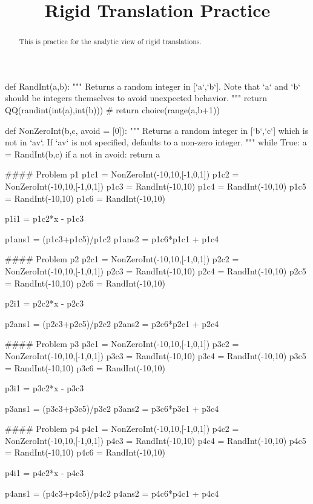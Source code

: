 \documentclass{ximeraXloud}
\title{Rigid Translation Practice}
\begin{document}
\begin{abstract}
    This is practice for the analytic view of rigid translations.
\end{abstract}
\maketitle

\begin{sagesilent}
def RandInt(a,b):
    """ Returns a random integer in [`a`,`b`]. Note that `a` and `b` should be integers themselves to avoid unexpected behavior.
    """
    return QQ(randint(int(a),int(b)))
    # return choice(range(a,b+1))

def NonZeroInt(b,c, avoid = [0]):
    """ Returns a random integer in [`b`,`c`] which is not in `av`. 
        If `av` is not specified, defaults to a non-zero integer.
    """
    while True:
        a = RandInt(b,c)
        if a not in avoid:
            return a


#### Problem p1
p1c1 = NonZeroInt(-10,10,[-1,0,1])
p1c2 = NonZeroInt(-10,10,[-1,0,1])
p1c3 = RandInt(-10,10)
p1c4 = RandInt(-10,10)
p1c5 = RandInt(-10,10)
p1c6 = RandInt(-10,10)

p1i1 = p1c2*x - p1c3

p1ans1 = (p1c3+p1c5)/p1c2
p1ans2 = p1c6*p1c1 + p1c4


#### Problem p2
p2c1 = NonZeroInt(-10,10,[-1,0,1])
p2c2 = NonZeroInt(-10,10,[-1,0,1])
p2c3 = RandInt(-10,10)
p2c4 = RandInt(-10,10)
p2c5 = RandInt(-10,10)
p2c6 = RandInt(-10,10)

p2i1 = p2c2*x - p2c3

p2ans1 = (p2c3+p2c5)/p2c2
p2ans2 = p2c6*p2c1 + p2c4


#### Problem p3
p3c1 = NonZeroInt(-10,10,[-1,0,1])
p3c2 = NonZeroInt(-10,10,[-1,0,1])
p3c3 = RandInt(-10,10)
p3c4 = RandInt(-10,10)
p3c5 = RandInt(-10,10)
p3c6 = RandInt(-10,10)

p3i1 = p3c2*x - p3c3

p3ans1 = (p3c3+p3c5)/p3c2
p3ans2 = p3c6*p3c1 + p3c4


#### Problem p4
p4c1 = NonZeroInt(-10,10,[-1,0,1])
p4c2 = NonZeroInt(-10,10,[-1,0,1])
p4c3 = RandInt(-10,10)
p4c4 = RandInt(-10,10)
p4c5 = RandInt(-10,10)
p4c6 = RandInt(-10,10)

p4i1 = p4c2*x - p4c3

p4ans1 = (p4c3+p4c5)/p4c2
p4ans2 = p4c6*p4c1 + p4c4



\end{sagesilent}
\end{document}

